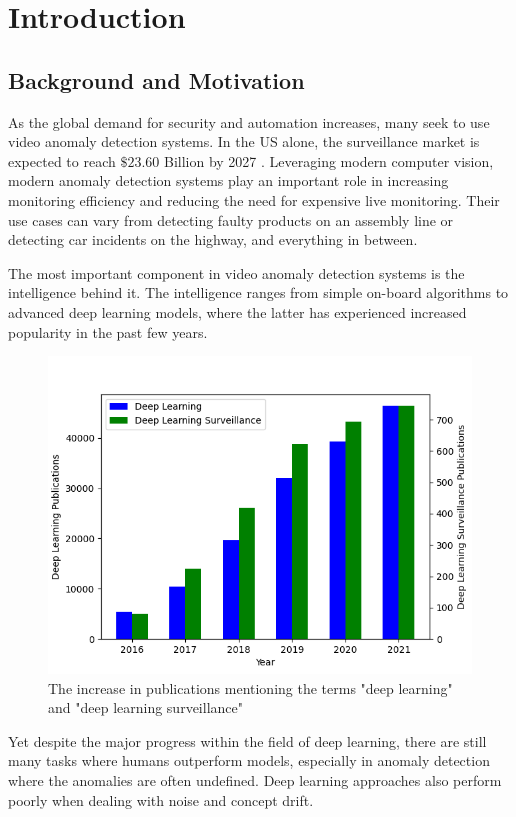 \chapter{Introduction}
\section{Background and Motivation}
As the global demand for security and automation increases, many seek to use video anomaly detection systems. In the US alone, the surveillance market is expected to reach $\$23.60$ Billion by 2027 \cite{us_video_stats}. Leveraging modern computer vision, modern anomaly detection systems play an important role in increasing monitoring efficiency and reducing the need for expensive live monitoring. Their use cases can vary from detecting faulty products on an assembly line or detecting car incidents on the highway, and everything in between.
\par
The most important component in video anomaly detection systems is the intelligence behind it. The intelligence ranges from simple on-board algorithms to advanced deep learning models, where the latter has experienced increased popularity in the past few years.\par
\begin{figure}[H]
    \centering
    \includegraphics[width=\linewidth]{resources/introduction/publications_graph.png}
    \caption{The increase in publications mentioning the terms "deep learning" and "deep learning surveillance" \cite{deep_learning_surveillance_stats}}
\end{figure}
Yet despite the major progress within the field of deep learning, there are still many tasks where humans outperform models, especially in anomaly detection where the anomalies are often undefined. Deep learning approaches also perform poorly when dealing with noise and concept drift.

